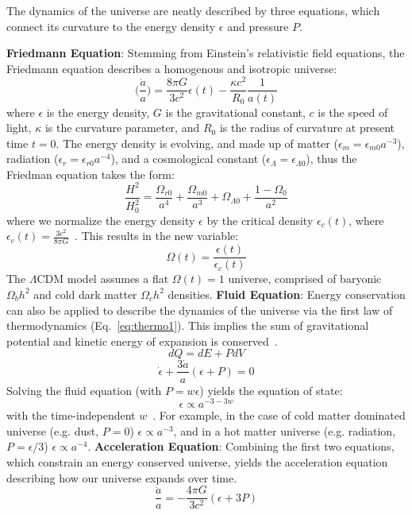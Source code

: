 The dynamics of the universe are neatly described by three equations, which connect its curvature to the energy density $\epsilon$ and pressure $P$.

\noindent
\textbf{Friedmann Equation}:  Stemming from Einstein's relativistic field equations, the Friedmann equation describes a homogenous and isotropic universe:  
\begin{equation}
    \bigg ( \frac{\Dot{a}}{a} \bigg ) = \frac{8\pi G}{3c^2}\epsilon(t) - \frac{\kappa c^2}{R_0}\frac{1}{a(t)}
\end{equation}
where $\epsilon$ is the energy density, $G$ is the gravitational constant, $c$ is the speed of light, $\kappa$ is the curvature parameter, and $R_0$ is the radius of curvature at present time $t=0$.  The energy density is evolving, and made up of matter ($\epsilon_m=\epsilon_{m0}a^{-3}$), radiation ($\epsilon_r=\epsilon_{r0}a^{-4}$), and a cosmological constant ($\epsilon_{\Lambda}=\epsilon_{\Lambda 0}$), thus the Friedman equation takes the form:
\begin{equation}
    \frac{H^2}{H_0^2} = \frac{\Omega_{r0}}{a^4} + \frac{\Omega_{m0}}{a^3} + \Omega_{\Lambda 0} + \frac{1-\Omega_0}{a^2}
\end{equation}
where we normalize the energy density $\epsilon$ by the critical density $\epsilon_c(t)$, where $\epsilon_c(t) = \frac{3c^2}{8\pi G}$~\cite{ryden_2016}.  This results in the new variable:
\begin{equation}
    \Omega(t) = \frac{\epsilon(t)}{\epsilon_c(t)}
\end{equation}
The $\Lambda$CDM model assumes a flat $\Omega(t)=1$ universe, comprised of baryonic $\Omega_b h^2$ and cold dark matter $\Omega_c h^2$ densities.
\noindent
\textbf{Fluid Equation}:  Energy conservation can also be applied to describe the dynamics of the universe via the first law of thermodynamics (Eq.~\ref{eq:thermo1}).  This implies the sum of gravitational potential and kinetic energy of expansion is conserved~\cite{ryden_2016}.
\begin{equation}
    dQ = dE + PdV
    \label{eq:thermo1}
\end{equation}
\begin{equation}
    \dot{\epsilon} + \frac{3\dot{a}}{a}(\epsilon + P) = 0
    \label{eq:fluid_universe}
\end{equation}
\noindent
Solving the fluid equation (with $P=w\epsilon$) yields the equation of state:
\begin{equation}
    \epsilon \propto a^{-3-3w}
\end{equation}
with the time-independent $w$~\cite{weinberg_cosmo}.  For example, in the case of cold matter dominated universe (e.g. dust, $P = 0$) $\epsilon\propto a^{-3}$, and in a hot matter universe (e.g. radiation, $P=\epsilon/3$) $\epsilon\propto a^{-4}$.
\noindent
\textbf{Acceleration Equation}: Combining the first two equations, which constrain an energy conserved universe, yields the acceleration equation describing how our universe expands over time.  
\begin{equation}
    \frac{\ddot{a}}{a} = - \frac{4\pi G}{3 c^2} (\epsilon + 3 P)
\end{equation}
